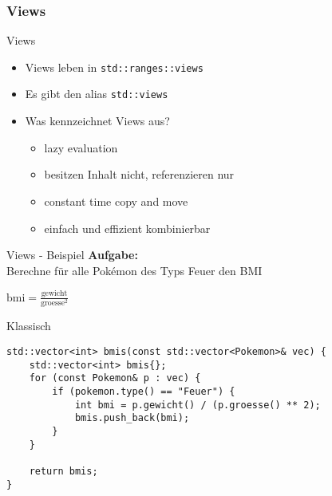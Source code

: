 \subsubsection{Views}

\begin{frame}{Views}
    \begin{itemize}
        \item<1-> Views leben in \texttt{std::ranges::views}
        \item<2-> Es gibt den alias \texttt{std::views}
        \item<3-> Was kennzeichnet Views aus?
            \begin{itemize}
                \item<4-> lazy evaluation
                \item<5-> besitzen Inhalt nicht, referenzieren nur
                \item<6-> constant time copy and move
                \item<7-> einfach und effizient kombinierbar
            \end{itemize}
    \end{itemize}
\end{frame}


\begin{frame}{Views - Beispiel}
    \textbf{Aufgabe:}\\
    Berechne für alle Pokémon des Typs Feuer den BMI

    \vspace{2.5em}

    \begin{center}
        $\text{bmi} = \frac{\text{gewicht}}{\text{groesse}^2}$
    \end{center}
\end{frame}

\begin{frame}[fragile]{Klassisch}
    \begin{verbatim}
std::vector<int> bmis(const std::vector<Pokemon>& vec) {
    std::vector<int> bmis{};
    for (const Pokemon& p : vec) {
        if (pokemon.type() == "Feuer") {
            int bmi = p.gewicht() / (p.groesse() ** 2);
            bmis.push_back(bmi);
        }
    }

    return bmis;
}
    \end{verbatim}
\end{frame}

